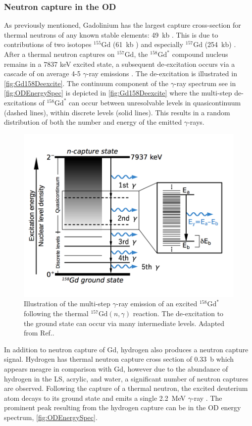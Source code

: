 \subsubsection{Neutron capture in the OD}
As previously mentioned, Gadolinium has the largest capture cross-section for thermal neutrons of any known stable elements: 49~kb \cite{Hagiwara:2018kmr}. This is due to contributions of two isotopes $^{155}\text{Gd}$ (61~kb ) and especially $^{157}\text{Gd}$ (254~kb) \cite{Hagiwara:2018kmr}. After a thermal neutron captures on $^{157}\text{Gd}$, the $^{158}\text{Gd}^*$ compound nucleus remains in a 7837 keV excited state, a subsequent de-excitation occurs via a cascade of on average 4-5 $\gamma$-ray emissions \cite{Hagiwara:2018kmr}. The de-excitation is illustrated in \autoref{fig:Gd158Deexcite}. The continuum component of the $\gamma$-ray spectrum see in \autoref{fig:ODEnergySpec} is depicted in \autoref{fig:Gd158Deexcite} where the multi-step de-excitations of $^{158}\text{Gd}^*$ can occur between unresolvable levels in quasicontinuum (dashed lines), within discrete levels (solid lines). This results in a random distribution of both the number and energy of the emitted $\gamma$-rays. 

\begin{figure}
    \centering
    \includegraphics[width=0.7\linewidth]{figures/LZ/ContinuumEmission2.png}
    \caption{Illustration of the multi-step $\gamma$-ray emission of an excited $^{158}\text{Gd}^*$ following the thermal $^{157}\text{Gd}(n,\gamma)$ reaction. The de-excitation to the ground state can occur via many intermediate levels. Adapted from Ref.\cite{Hagiwara:2018kmr}.}
    \label{fig:Gd158Deexcite}
\end{figure}

In addition to neutron capture of Gd, hydrogen also produces a neutron capture signal. Hydrogen has thermal neutron capture cross section of 0.33~b which appears meagre in comparison with Gd, however due to the abundance of hydrogen in the LS, acrylic, and water, a significant number of neutron captures are observed. Following the capture of a thermal neutron, the excited deuterium atom decays to its ground state and emits a single 2.2~MeV $\gamma$-ray \cite{LZTDR}. The prominent peak resulting from the hydrogen capture can be in the OD energy spectrum, \autoref{fig:ODEnergySpec}.


